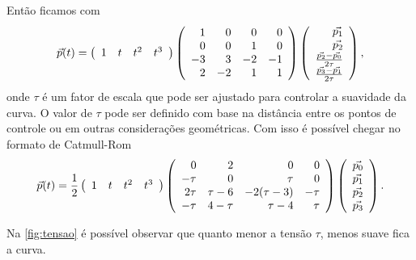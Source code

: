 Então ficamos com
\begin{equation}
    {\vec{p}}(t) =  
        \left(
        \begin{array}{rrrr}
            1 & t & t^2 & t^3
        \end{array}
        \right)
        \left(
        \begin{array}{rrrr}
            1 & 0 & 0 & 0 \\
            0 & 0 & 1 & 0 \\
            -3 & 3 & -2 & -1 \\
                2 & -2 & 1 & 1
        \end{array}
        \right)
    \left(
        \begin{array}{r}
            {\vec{p_1}} \\
            {\vec{p_2}} \\
            \frac{{\vec{p_2}} - {\vec{p_0}}}{2\tau} \\
                \frac{{\vec{p_3}} - {\vec{p_1}}}{2\tau}
        \end{array}
        \right),
\end{equation}
onde $\tau$ é um fator de escala que pode ser ajustado para controlar a suavidade da curva. O valor de $\tau$ pode ser definido com base na distância entre os pontos de controle ou em outras considerações geométricas. Com isso é possível chegar no formato de Catmull-Rom
\begin{equation}
    {\vec{p}}(t) = \frac{1}{2}
       \left(
 	\begin{array}{rrrr}
 		1 & t & t^2 & t^3
 	\end{array}
    \right)
    \left(
 	\begin{array}{rrrr}
 		0 & 2 & 0 & 0 \\
 	    -\tau & 0 & \tau & 0 \\
 		2\tau & \tau-6 & -2(\tau-3) & -\tau \\
            -\tau & 4-\tau & \tau-4 & \tau
 	\end{array}
    \right)
   \left(
 	\begin{array}{r}
 		{\vec{p_0}} \\
 	    {\vec{p_1}} \\
 		{\vec{p_2}} \\
            {\vec{p_3}}
 	\end{array}
    \right).
\end{equation}

Na \autoref{fig:tensao} é possível observar que quanto menor a tensão $\tau$, menos suave fica a curva.

